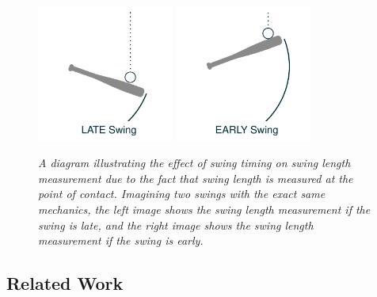 \documentclass{article}
\begin{document}
    \begin{figure}
      \centering
      \includegraphics[width = 0.4\textwidth]{../../figures/swing_late.pdf}
      \includegraphics[width = 0.4\textwidth]{../../figures/swing_early.pdf}
      \caption{\it A diagram illustrating the effect of swing timing on swing length measurement due to the fact that swing length is measured at the point of contact. Imagining two swings with the exact same mechanics, the left image shows the swing length measurement if the swing is late, and the right image shows the swing length measurement if the swing is early.}
      \label{fig:swing-diagram}
    \end{figure}

    \subsection{Related Work}
    \label{sec:related-work}
\end{document}
